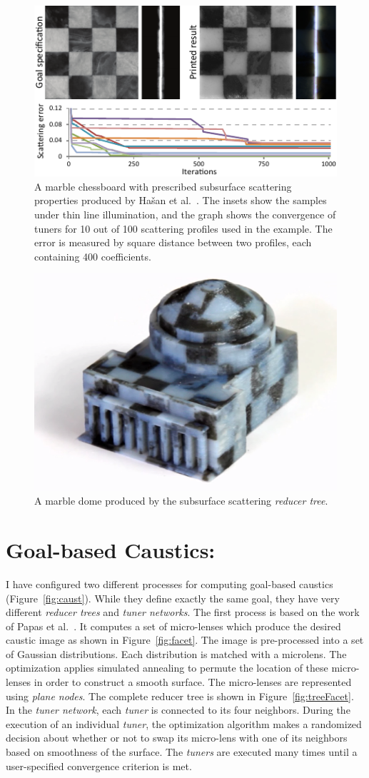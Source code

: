 \begin{figure}[h]
\centering
\includegraphics[width=0.65\linewidth]{figure/fig_chess.pdf}
\caption{
	A marble chessboard with prescribed subsurface scattering properties produced by Ha\v{s}an et al.~.
	The insets show the samples under thin line illumination, and the graph shows the convergence of tuners for 10 out of 100 scattering profiles used in the example. The error is measured by square distance between two profiles, each containing 400 coefficients.}
\label{fig:sub}
\end{figure}

\begin{figure}[h]
\centering
\includegraphics[width=0.45\linewidth]{figure/dome.png}
\caption{
	A marble dome produced by the subsurface scattering \emph{reducer tree}.}
\label{fig:dome}
\end{figure}

\section{Goal-based Caustics:}
I have configured two different processes for computing goal-based caustics (Figure~\ref{fig:caust}). While they define exactly the same goal, they have very different \emph{reducer trees} and \emph{tuner networks}.
The first process is based on the work of Papas et al.~.
It computes a set of micro-lenses which produce the desired caustic image as shown in Figure~\ref{fig:facet}.
The image is pre-processed into a set of Gaussian distributions.
Each distribution is matched with a microlens.
The optimization applies simulated annealing to permute the location of these micro-lenses
in order to construct a smooth surface.
The micro-lenses are represented using \emph{plane nodes}.
The complete reducer tree is shown in Figure~\ref{fig:treeFacet}.
In the \emph{tuner network}, each \emph{tuner} is connected to its four neighbors.
During the execution of an individual \emph{tuner},
the optimization algorithm makes a randomized decision
about whether or not to swap its micro-lens with one of its neighbors based on smoothness of the surface.
The \emph{tuners} are executed many times until a user-specified convergence criterion is met. 

